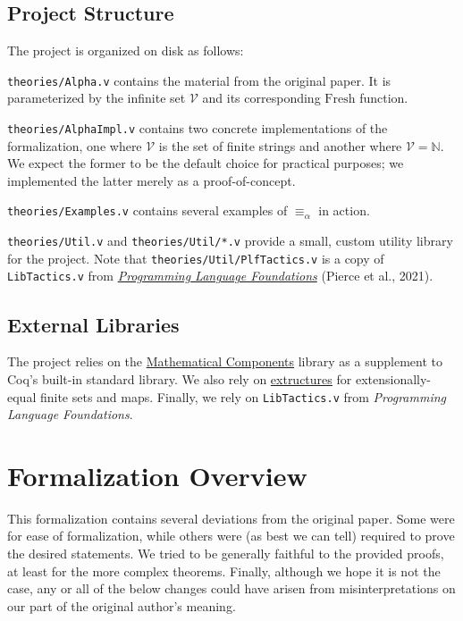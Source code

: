 \documentclass{article}
\begin{document}
\subsection{Project Structure}

The project is organized on disk as follows:

\verb|theories/Alpha.v| contains the material from the original paper. It is parameterized by the
infinite set $\mathcal{V}$ and its corresponding $\textrm{Fresh}$ function.

\verb|theories/AlphaImpl.v| contains two concrete implementations of the formalization, one where
$\mathcal{V}$ is the set of finite strings and another where $\mathcal{V} = \mathbb{N}$. We expect
the former to be the default choice for practical purposes; we implemented the latter merely as a
proof-of-concept.

\verb|theories/Examples.v| contains several examples of $\equiv_\alpha$ in action.

\verb|theories/Util.v| and \verb|theories/Util/*.v| provide a small, custom utility library for the
project. Note that \verb|theories/Util/PlfTactics.v| is a copy of \verb|LibTactics.v| from
\href{https://softwarefoundations.cis.upenn.edu/plf-current/}{\emph{Programming Language
Foundations}} (Pierce et al., 2021).

\subsection{External Libraries}

The project relies on the \href{https://math-comp.github.io}{Mathematical Components} library as a
supplement to Coq's built-in standard library. We also rely on
\href{https://github.com/arthuraa/extructures}{extructures} for extensionally-equal finite sets and
maps. Finally, we rely on \verb|LibTactics.v| from \emph{Programming Language Foundations}.

\section{Formalization Overview}

This formalization contains several deviations from the original paper. Some were for ease of
formalization, while others were (as best we can tell) required to prove the desired statements. We
tried to be generally faithful to the provided proofs, at least for the more complex theorems.
Finally, although we hope it is not the case, any or all of the below changes could have arisen from
misinterpretations on our part of the original author's meaning.
\end{document}
